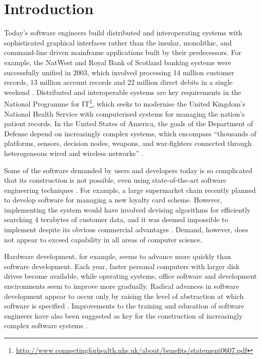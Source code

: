 
\chapter{Introduction}
\label{Introduction}
Today's software engineers build distributed and interoperating systems with sophisticated graphical interfaces rather than the insular, monolithic, and command-line driven mainframe applications built by their predecessors. For \cc example, the NatWest and Royal Bank of Scotland banking systems were successfully unified in 2003, which involved processing 14 million customer records, 13 million account records and 22 million direct debits in a single weekend \cite[pg26]{rae04challenges}. Distributed and interoperable systems are key requirements in the National Programme for IT\footnote{\url{http://www.connectingforhealth.nhs.uk/about/benefits/statement0607.pdf}}, which seeks to modernise the United Kingdom's National Health Service with computerised systems for managing the nation's patient records. In the United States of America, the goals of the Department of Defense depend on increasingly complex systems, which encompass ``thousands of platforms, sensors, decision nodes, weapons, and war-fighters connected through heterogeneous wired and wireless networks'' \cite{northrop06ulss}.

Some of the software demanded by users and developers today is so complicated that its construction is not possible, even using state-of-the-art software engineering techniques \cite{selic03pragmatics}. For \cc example, a large supermarket chain recently planned to develop software for managing a new loyalty card scheme. However, implementing the system would have involved devising algorithms for efficiently searching 4 terabytes of customer data, and it was deemed impossible to implement despite its obvious commercial advantages \cite[pg15]{rae04challenges}. Demand, however, does not appear to exceed capability in all areas of computer science.


Hardware development, for example, seems to advance more quickly than software development. Each year, faster personal computers with larger disk drives become available, while operating systems, office software and development environments seem to improve more gradually. Radical \cc advances in software development appear to occur only by raising the level of abstraction at which software is specified \cite{brooks86nosilverbullet,selic03pragmatics,kleppe03mda}. Improvements \cc to the training and education of software engineers have also been suggested as key for the construction of increasingly complex software systems \cite{rae04challenges}.




